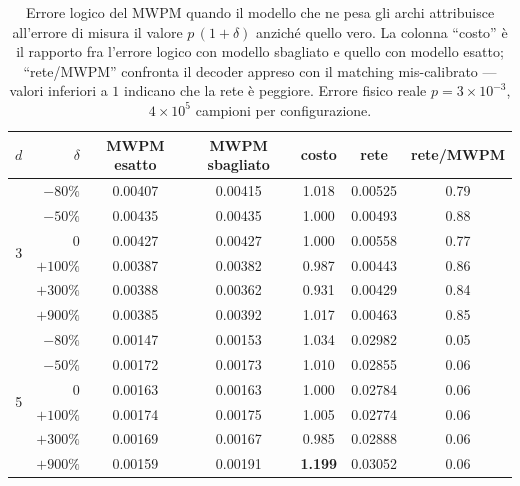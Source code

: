 \begin{table}[H]

\centering
\footnotesize
\setlength{\tabcolsep}{4pt}
\begin{tabular}{crccccc}
\toprule
$d$ & $\delta$ & \textbf{MWPM esatto} & \textbf{MWPM sbagliato} & \textbf{costo} & \textbf{rete} & \textbf{rete/MWPM} \\
\midrule
\multirow{6}{*}{3} & $-80\%$  & 0.00407 & 0.00415 & 1.018 & 0.00525 & 0.79 \\
\addlinespace[0.3em]
                   & $-50\%$  & 0.00435 & 0.00435 & 1.000 & 0.00493 & 0.88 \\
\addlinespace[0.3em]
                   & $0$      & 0.00427 & 0.00427 & 1.000 & 0.00558 & 0.77 \\
\addlinespace[0.3em]
                   & $+100\%$ & 0.00387 & 0.00382 & 0.987 & 0.00443 & 0.86 \\
\addlinespace[0.3em]
                   & $+300\%$ & 0.00388 & 0.00362 & 0.931 & 0.00429 & 0.84 \\
\addlinespace[0.3em]
                   & $+900\%$ & 0.00385 & 0.00392 & 1.017 & 0.00463 & 0.85 \\
\midrule
\multirow{6}{*}{5} & $-80\%$  & 0.00147 & 0.00153 & 1.034 & 0.02982 & 0.05 \\
\addlinespace[0.3em]
                   & $-50\%$  & 0.00172 & 0.00173 & 1.010 & 0.02855 & 0.06 \\
\addlinespace[0.3em]
                   & $0$      & 0.00163 & 0.00163 & 1.000 & 0.02784 & 0.06 \\
\addlinespace[0.3em]
                   & $+100\%$ & 0.00174 & 0.00175 & 1.005 & 0.02774 & 0.06 \\
\addlinespace[0.3em]
                   & $+300\%$ & 0.00169 & 0.00167 & 0.985 & 0.02888 & 0.06 \\
\addlinespace[0.3em]
                   & $+900\%$ & 0.00159 & 0.00191 & \textbf{1.199} & 0.03052 & 0.06 \\
\bottomrule
\end{tabular}
\caption[Effetto di un modello di rumore mis-calibrato sul MWPM]{Errore logico del \ac{MWPM} quando il modello che ne pesa gli archi attribuisce all'errore di misura il valore $p\,(1+\delta)$ anziché quello vero. La colonna ``costo'' è il rapporto fra l'errore logico con modello sbagliato e quello con modello esatto; ``rete/MWPM'' confronta il decoder appreso con il matching mis-calibrato --- valori inferiori a $1$ indicano che la rete è peggiore. Errore fisico reale $p = 3\times10^{-3}$, $4\times10^{5}$ campioni per configurazione.}\label{tab:neural_miscalibrato}

\end{table}

